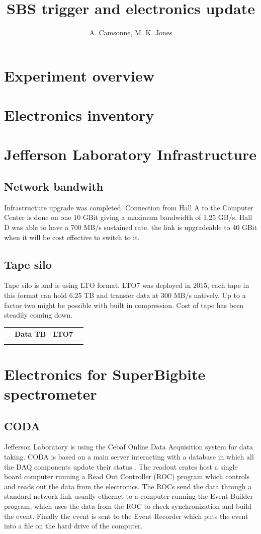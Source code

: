 \documentclass{article}
\title{SBS trigger and electronics update}
\author{A. Camsonne, M. K. Jones}
\begin{document}
\maketitle
\section{Experiment overview}

\section{Electronics inventory}

\section{Jefferson Laboratory Infrastructure}
\subsection {Network bandwith}
Infrastructure upgrade was completed.
Connection from Hall A to the Computer Center is done on one 10 GBit giving a maximum bandwidth
of 1.25 GB/s. Hall D was able to have a 700 MB/s sustained rate.
the link is upgradeable to 40 GBit when it will be cost effective to switch to it.
\subsection {Tape silo}
Tape silo is  and is using LTO format. LTO7 was deployed in 2015, each tape in this format
can hold 6.25 TB and transfer data at 300 MB/s natively.
Up to a factor two might be possible with built in compression.
Cost of tape has been steadily coming down.

\begin{tabular}{|c|c|c|c|}
  \hline
  & Data TB & LTO7 \\
  \hline
  &  & &\\
  \hline
\end{tabular}
\section{Electronics for SuperBigbite spectrometer}
\subsection{CODA}
Jefferson Laboratory is using the Cebaf Online Data Acquisition system for data taking.
CODA is based on a main server interacting with a database in which all the DAQ components update their status . The readout crates host a single board computer running a Read Out Controller (ROC) program which controls and reads out the data from the electronics. The ROCs send the data through a standard network link usually ethernet to a computer running the Event Builder program, which uses the data from the ROC to check synchronization and build the event. Finally the event is sent to the Event Recorder which puts the event into a file on the hard drive of the computer. 
\end{document}
